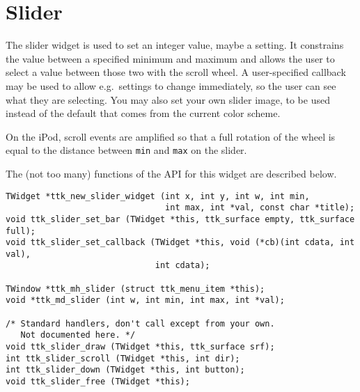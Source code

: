 \documentclass[12pt,letterpaper]{report}
\begin{document}
\section{Slider}
The slider widget is used to set an integer value, maybe a setting. It constrains the value between
a specified minimum and maximum and allows the user to select a value between those two with the
scroll wheel. A user-specified callback may be used to allow e.g.~settings to change immediately, so
the user can see what they are selecting. You may also set your own slider image, to be used instead
of the default that comes from the current color scheme.

On the iPod, scroll events are amplified so that a full rotation of the wheel is equal to the
distance between \verb|min| and \verb|max| on the slider.

The (not too many) functions of the API for this widget are described below.

\begin{verbatim}
TWidget *ttk_new_slider_widget (int x, int y, int w, int min,
                                int max, int *val, const char *title);
void ttk_slider_set_bar (TWidget *this, ttk_surface empty, ttk_surface full);
void ttk_slider_set_callback (TWidget *this, void (*cb)(int cdata, int val),
                              int cdata);

TWindow *ttk_mh_slider (struct ttk_menu_item *this);
void *ttk_md_slider (int w, int min, int max, int *val);

/* Standard handlers, don't call except from your own.
   Not documented here. */
void ttk_slider_draw (TWidget *this, ttk_surface srf);
int ttk_slider_scroll (TWidget *this, int dir);
int ttk_slider_down (TWidget *this, int button);
void ttk_slider_free (TWidget *this);
\end{verbatim}
\end{document}
